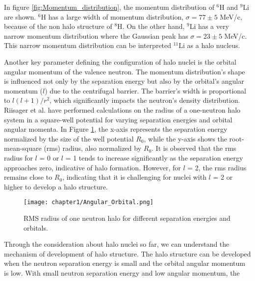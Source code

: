 In figure \ref{fig:Momentum_distribution}, the momentum distribution of ${}^{6}$H and ${}^{9}$Li are shown. ${}^{6}$H has a large width of momentum distribution, $\sigma = 77 \pm 5$ MeV/c, because of the non halo structure of ${}^{8}$H. On the other hand, ${}^{9}$Li has a very narrow momentum distribution where the Gaussian peak has $\sigma  = 23 \pm 5$ MeV/c. This narrow momentum distribution can be interpreted ${}^{11}$Li as a halo nucleus.

Another key parameter defining the configuration of halo nuclei is the orbital angular momentum of the valence neutron. The momentum distribution's shape is influenced not only by the separation energy but also by the orbital's angular momentum ($l$) due to the centrifugal barrier. The barrier's width is proportional to $l(l+1)/r^2$, which significantly impacts the neutron's density distribution. Riisager et al. \cite{Riisager} have performed calculations on the radius of a one-neutron halo system in a square-well potential for varying separation energies and orbital angular momenta. In Figure \ref{fig:Angular_Orbital}, the x-axis represents the separation energy normalized by the size of the well potential $R_0$, while the y-axis shows the root-mean-square (rms) radius, also normalized by $R_0$.  It is observed that the rms radius for $l$ = 0 or $l$ = 1 tends to increase significantly as the separation energy approaches zero, indicative of halo formation. However, for $l$ = 2, the rms radius remains close to $R_0$, indicating that it is challenging for nuclei with $l$ = 2 or higher to develop a halo structure.

\begin{figure}
    \centering
    \texttt{[image: chapter1/Angular\_Orbital.png]}
    \caption{RMS radius of one neutron halo for different separation energies and orbitals. \cite{Riisager}}
    \label{fig:Angular_Orbital}
\end{figure}

Through the consideration about halo nuclei so far, we can understand the mechanism of development of halo structure. The halo structure can be developed when the neutron separation energy is small and the orbital angular momentum is low. With small neutron separation energy and low angular momentum, the 

